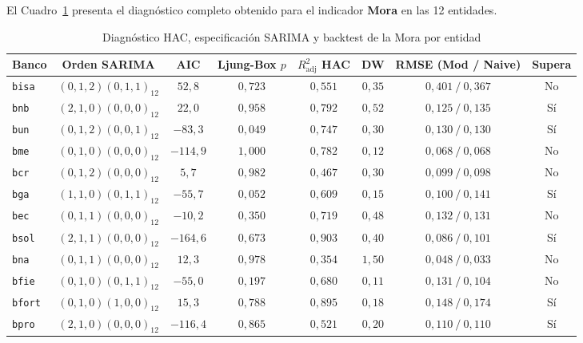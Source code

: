 \documentclass[11pt,letterpaper]{article}
\begin{document}
El Cuadro~\ref{tab:mora_detalle} presenta el diagnóstico completo obtenido para el indicador \textbf{Mora} en las 12 entidades.

\begin{table}[H]
\centering
\caption{Diagnóstico HAC, especificación SARIMA y backtest de la Mora por entidad}
\label{tab:mora_detalle}
\small
\begin{tabular}{lccccccc}
\toprule
Banco & Orden SARIMA & AIC & Ljung-Box \(p\) & \(R^2_{\text{adj}}\) HAC & DW & RMSE (Mod / Naive) & Supera \\
\midrule
\texttt{bisa} & \((0,1,2)(0,1,1)_{12}\) & \(52{,}8\) & \(0{,}723\) & \(0{,}551\) & \(0{,}35\) & \(0{,}401\ /\ 0{,}367\) & No \\
\texttt{bnb} & \((2,1,0)(0,0,0)_{12}\) & \(22{,}0\) & \(0{,}958\) & \(0{,}792\) & \(0{,}52\) & \(0{,}125\ /\ 0{,}135\) & Sí \\
\texttt{bun} & \((0,1,2)(0,0,1)_{12}\) & \(-83{,}3\) & \(0{,}049\) & \(0{,}747\) & \(0{,}30\) & \(0{,}130\ /\ 0{,}130\) & Sí \\
\texttt{bme} & \((0,1,0)(0,0,0)_{12}\) & \(-114{,}9\) & \(1{,}000\) & \(0{,}782\) & \(0{,}12\) & \(0{,}068\ /\ 0{,}068\) & No \\
\texttt{bcr} & \((0,1,2)(0,0,0)_{12}\) & \(5{,}7\) & \(0{,}982\) & \(0{,}467\) & \(0{,}30\) & \(0{,}099\ /\ 0{,}098\) & No \\
\texttt{bga} & \((1,1,0)(0,1,1)_{12}\) & \(-55{,}7\) & \(0{,}052\) & \(0{,}609\) & \(0{,}15\) & \(0{,}100\ /\ 0{,}141\) & Sí \\
\texttt{bec} & \((0,1,1)(0,0,0)_{12}\) & \(-10{,}2\) & \(0{,}350\) & \(0{,}719\) & \(0{,}48\) & \(0{,}132\ /\ 0{,}131\) & No \\
\texttt{bsol} & \((2,1,1)(0,0,0)_{12}\) & \(-164{,}6\) & \(0{,}673\) & \(0{,}903\) & \(0{,}40\) & \(0{,}086\ /\ 0{,}101\) & Sí \\
\texttt{bna} & \((0,1,1)(0,0,0)_{12}\) & \(12{,}3\) & \(0{,}978\) & \(0{,}354\) & \(1{,}50\) & \(0{,}048\ /\ 0{,}033\) & No \\
\texttt{bfie} & \((0,1,0)(0,1,1)_{12}\) & \(-55{,}0\) & \(0{,}197\) & \(0{,}680\) & \(0{,}11\) & \(0{,}131\ /\ 0{,}104\) & No \\
\texttt{bfort} & \((0,1,0)(1,0,0)_{12}\) & \(15{,}3\) & \(0{,}788\) & \(0{,}895\) & \(0{,}18\) & \(0{,}148\ /\ 0{,}174\) & Sí \\
\texttt{bpro} & \((2,1,0)(0,0,0)_{12}\) & \(-116{,}4\) & \(0{,}865\) & \(0{,}521\) & \(0{,}20\) & \(0{,}110\ /\ 0{,}110\) & Sí \\
\bottomrule
\end{tabular}
\end{table}
\end{document}
